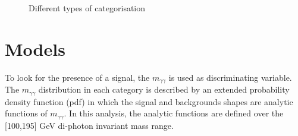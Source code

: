 \documentclass[a4paper, oneside, 11pt, openright]{book}
\begin{document}
 			\begin{figure}[h!]
 				\centering
 				\\
 				\\				
 				\caption{Different types of categorisation}
 				\label{fig:Cats}
 			\end{figure}
 		\section{Models}
 			To look for the presence of a signal, the $m_{\gamma\gamma}$ is used as discriminating variable. The $m_{\gamma\gamma}$ distribution in each category is described by an extended probability density function (pdf) in which the signal and backgrounds shapes are analytic functions of $m_{\gamma\gamma}$. In this analysis, the analytic functions are defined over the [100,195] GeV di-photon invariant mass range. %
 			
\end{document}
